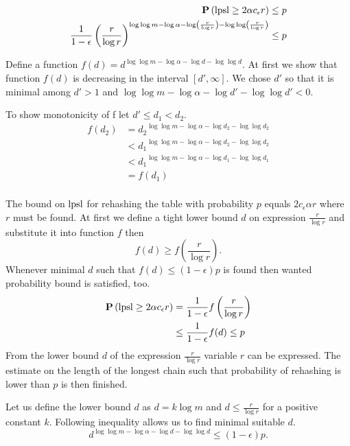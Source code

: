 \[
\begin{split}
\mathbf{P}\left(\mathrm{lpsl} \geq 2\alpha c_\epsilon r\right) & \leq p \\ 
\frac{1}{1 - \epsilon}\left(\frac{r}{\log r}\right)^{\log \log m - \log \alpha - \log \left(\frac{r}{\log r}\right) - \log \log \left(\frac{r}{\log r}\right)} & \leq p \\
\end{split}
\]

Define a function $f(d) = d ^ {\log \log m - \log \alpha - \log d - \log \log d}$. At first we show that function $f(d)$ is decreasing in the interval $\left[ d', \infty \right]$. We chose $d'$ so that it is minimal among $d' > 1$ and $\log \log m - \log \alpha - \log d' - \log \log d' < 0$. 

To show monotonicity of f let $d' \leq d_1 < d_2$.
\[
\begin{split}
f(d_2) 
	& = {d_2} ^ {\log \log m - \log \alpha - \log d_2 - \log \log d_2} \\
	& < {d_1} ^ {\log \log m - \log \alpha - \log d_2 - \log \log d_2} \\
	& < {d_1} ^ {\log \log m - \log \alpha - \log d_1 - \log \log d_1} \\
	& = f(d_1) \\
\end{split}
\]

The bound on $\mathrm{lpsl}$ for rehashing the table with probability $p$ equals $2 c_\epsilon \alpha r$ where $r$ must be found. At first we define a tight lower bound $d$ on expression $\frac{r}{\log r}$ and substitute it into function $f$ then \[ f(d) \geq f\left(\frac{r}{\log r}\right) \text{.} \] Whenever minimal $d$ such that $f(d) \leq (1 - \epsilon) p$ is found then wanted probability bound is satisfied, too.
\[ 
\begin{split}
\mathbf{P}\left(\mathrm{lpsl} \geq 2 \alpha c_\epsilon r\right) 
	& = \frac{1}{1 - \epsilon} f\left(\frac{r}{\log r}\right) \\
	& \leq \frac{1}{1-\epsilon}f(d) \leq p \\
\end{split}
\]
From the lower bound $d$ of the expression $\frac{r}{\log r}$ variable $r$ can be expressed. The estimate on the length of the longest chain such that probability of rehashing is lower than $p$ is then finished.

Let us define the lower bound $d$ as $d = k \log m$ and $d \leq \frac{r}{\log r}$ for a positive constant $k$. Following inequality allows us to find minimal suitable $d$.
\[
d ^ {\log \log m - \log \alpha - \log d - \log \log d} \leq (1 - \epsilon) p \text{.}
\]

